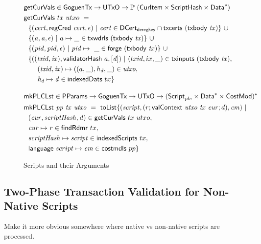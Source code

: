 \begin{figure}[htb]
  \begin{align*}
    & \fun{getCurVals} \in \GoguenTx \to \UTxO \to \powerset{(\CurItem \times \ScriptHash \times \seqof{\Data})} \\
    & \fun{getCurVals}~{tx}~{utxo}~=~ \\
    & ~~\{ (\var{cert}, \fun{regCred}~\var{cert}, \epsilon) ~|~
      \var{cert} \in \DCertDeRegKey\cap\fun{txcerts}~(\txbody{tx}) \}~\cup \\
    & ~~\{ (\var{a}, \var{a}, \epsilon) ~|~ a \mapsto \_ \in\fun{txwdrls}~(\txbody{tx}) \}~\cup \\
    & ~~\{ (\var{pid}, \var{pid}, \epsilon) ~|~ \var{pid}\mapsto ~ \_ \in \fun{forge}~(\txbody{tx}) \}~\cup \\
    & ~~\{ ((\var{txid}, \var{ix}), \fun{validatorHash}~{a}, [\var{d}]) ~|~ (txid,ix, \_) \in \fun{txinputs}~(\txbody{tx}), \\
    & ~~~~~~(\var{txid}, \var{ix}) \mapsto ((a,\_),h_d, \_) \in \var{utxo}, \\
    & ~~~~~~\var{h_d}\mapsto \var{d} \in \fun{indexedDats}~{tx} \}
    \nextdef
    & \fun{mkPLCLst} \in \PParams \to \GoguenTx \to \UTxO \to \seqof{(\ScriptPlutus \times \seqof{\Data} \times \CostMod)} \\
    & \fun{mkPLCLst} ~\var{pp}~\var{tx}~ \var{utxo} ~=~
      \fun{toList} \{ (\var{script}, (r; \fun{valContext}~\var{utxo}~\var{tx}~\var{cur}; d), \var{cm}) ~|~ \\
    & ~~(\var{cur}, \var{scriptHash}, \var{d}) \in \fun{getCurVals}~{tx}~{utxo}, \\
    & ~~\var{cur} \mapsto \var{r} \in \fun{findRdmr}~{tx}, \\
    & ~~\var{scriptHash}\mapsto \var{script}\in \fun{indexedScripts}~{tx}, \\
    & ~~\fun{language}~{script} \mapsto \var{cm} \in \fun{costmdls}~{pp} \}
  \end{align*}
  \caption{Scripts and their Arguments}
  \label{fig:functions:script2}
\end{figure}

\subsection{Two-Phase Transaction Validation for Non-Native Scripts}
\label{sec:two-phase}

\begin{note}
  Make it more obvious somewhere where native vs non-native scripts are processed.
\end{note}

